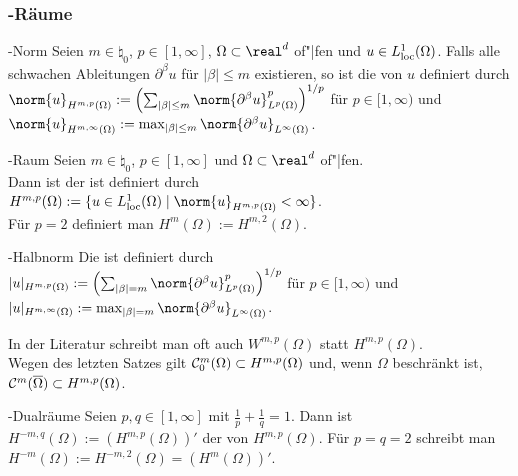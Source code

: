 \subsubsection{%
    -Räume%
}

\begin{Def}{-Norm}
    Seien $m \in \natural_0$, $p \in [1, \infty]$, $\Omega \subset \real^d$ of"|fen und
    $u \in L^1_{\text{loc}}(\Omega)$.
    Falls alle schwachen Ableitungen $\partial^\beta u$ für $|\beta| \le m$ existieren, so ist
    die  von $u$ definiert durch
    $\norm{u}_{H^{m,p}(\Omega)} :=
    \left(\sum_{|\beta| \le m} \norm{\partial^\beta u}_{L^p(\Omega)}^p\right)^{1/p}$
    für $p \in [1, \infty)$ und
    $\norm{u}_{H^{m,\infty}(\Omega)} :=
    \max_{|\beta| \le m} \norm{\partial^\beta u}_{L^\infty(\Omega)}$.
\end{Def}

\begin{Def}{-Raum}
    Seien $m \in \natural_0$, $p \in [1, \infty]$ und $\Omega \subset \real^d$ of"|fen.\\
    Dann ist der  ist definiert durch
    $H^{m,p}(\Omega) := \{u \in L^1_\loc(\Omega) \;|\; \norm{u}_{H^{m,p}(\Omega)} < \infty\}$.\\
    Für $p = 2$ definiert man
    $H^m(\Omega) := H^{m,2}(\Omega)$.
\end{Def}

\linie

\begin{Def}{-Halbnorm}
    Die  ist definiert durch\\
    $|u|_{H^{m,p}(\Omega)} :=
    \left(\sum_{|\beta| = m} \norm{\partial^\beta u}_{L^p(\Omega)}^p\right)^{1/p}$
    für $p \in [1, \infty)$ und
    $|u|_{H^{m,\infty}(\Omega)} :=
    \max_{|\beta| = m} \norm{\partial^\beta u}_{L^\infty(\Omega)}$.
\end{Def}

\begin{Bem}
    In der Literatur schreibt man oft auch $W^{m,p}(\Omega)$ statt $H^{m,p}(\Omega)$.\\
    Wegen des letzten Satzes gilt $\mathcal{C}^m_0(\Omega) \subset H^{m,p}(\Omega)$ und,
    wenn $\Omega$ beschränkt ist, $\mathcal{C}^m(\overline{\Omega}) \subset H^{m,p}(\Omega)$.
\end{Bem}

\linie

\begin{Def}{-Dualräume}
    Seien $p, q \in [1, \infty]$ mit $\frac{1}{p} + \frac{1}{q} = 1$.
    Dann ist $H^{-m,q}(\Omega) := (H^{m,p}(\Omega))'$ der 
    von $H^{m,p}(\Omega)$.
    Für $p = q = 2$ schreibt man $H^{-m}(\Omega) := H^{-m,2}(\Omega) = (H^m(\Omega))'$.
\end{Def}

